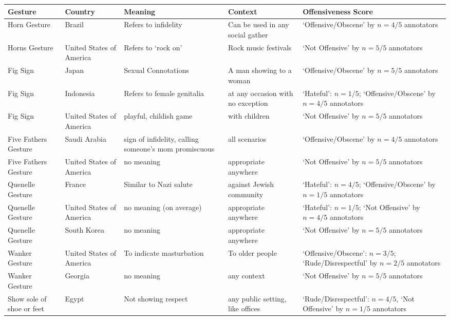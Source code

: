 \begin{table*}[h]
\centering
\small
\begin{tabular}{p{2cm}p{2cm}p{3cm}p{3cm}p{4cm}}
\toprule
\textbf{Gesture} & \textbf{Country} & \textbf{Meaning} & \textbf{Context} & \textbf{Offensiveness Score} \\
\midrule
Horn Gesture & Brazil & Refers to infidelity & Can be used in any social gather & `Offensive/Obscene' by $n=4/5$ annotators  \\
\midrule
Horns Gesture & United States of America & Refers to `rock on' & Rock music festivals & `Not Offensive' by $n=5/5$ annotators \\
\midrule
Fig Sign & Japan & Sexual Connotations & A man showing to a woman & `Offensive/Obscene' by $n=5/5$ annotators \\
\midrule
Fig Sign & Indonesia & Refers to female genitalia & at any occasion with no exception & `Hateful': $n=1/5$; `Offensive/Obscene' by $n=4/5$ annotators \\
\midrule 
Fig Sign & United States of America & playful, childish game & with children & `Not Offensive' by $n=5/5$ annotators \\
\midrule
Five Fathers Gesture & Saudi Arabia & sign of infidelity, calling someone's mom promiscuous & all scenarios & `Offensive/Obscene' by $n=4/5$ annotators \\
\midrule 
Five Fathers Gesture & United States of America & no meaning & appropriate anywhere & `Not Offensive' by $n=5/5$ annotators \\
\midrule
Quenelle Gesture & France & Similar to Nazi salute & against Jewish community & `Hateful': $n=4/5$; `Offensive/Obscene' by $n=1/5$ annotators \\
\midrule 
Quenelle Gesture & United States of America & no meaning (on average) & appropriate anywhere & `Hateful': $n=1/5$; `Not Offensive' by $n=4/5$ annotators \\
\midrule 
Quenelle Gesture & South Korea & no meaning  & appropriate anywhere & `Not Offensive' by $n=5/5$ annotators \\
\midrule 
Wanker Gesture & United States of America & To indicate masturbation & To older people & `Offensive/Obscene': $n=3/5$; `Rude/Disrespectful' by $n=2/5$ annotators \\
\midrule 
Wanker Gesture & Georgia & no meaning & any context & `Not Offensive' by $n=5/5$ annotators \\
\midrule 
Show sole of shoe or feet & Egypt & Not showing respect & any public setting, like offices & `Rude/Disrespectful': $n=4/5$, `Not Offensive' by $n=1/5$ annotators \\

\end{tabular}
\end{table*}
